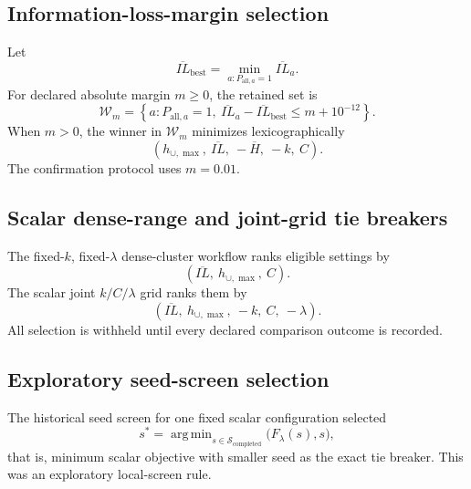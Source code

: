 \documentclass[11pt,a4paper]{article}
\DeclareMathOperator*{\argmin}{arg\,min}
\begin{document}
\subsection{Information-loss-margin selection}

Let
\begin{equation}
\overline{IL}_{\mathrm{best}}
=\min_{a:P_{\mathrm{all},a}=1}\overline{IL}_a.
\tag{93}
\end{equation}
For declared absolute margin $m\ge0$, the retained set is
\begin{equation}
\mathcal W_m=\left\{a:P_{\mathrm{all},a}=1,
\ \overline{IL}_a-\overline{IL}_{\mathrm{best}}
\le m+10^{-12}\right\}.
\tag{94}
\end{equation}
When $m>0$, the winner in $\mathcal W_m$ minimizes lexicographically
\begin{equation}
\left(h_{\cup,\max},\ \overline{IL},\ -\overline H,\ -k,\ C\right).
\tag{95}
\end{equation}
The confirmation protocol uses $m=0.01$.

\subsection{Scalar dense-range and joint-grid tie breakers}

The fixed-$k$, fixed-$\lambda$ dense-cluster workflow ranks eligible settings by
\begin{equation}
\left(\overline{IL},\ h_{\cup,\max},\ C\right).
\tag{96}
\end{equation}
The scalar joint $k/C/\lambda$ grid ranks them by
\begin{equation}
\left(\overline{IL},\ h_{\cup,\max},\ -k,\ C,\ -\lambda\right).
\tag{97}
\end{equation}
All selection is withheld until every declared comparison outcome is recorded.

\subsection{Exploratory seed-screen selection}

The historical seed screen for one fixed scalar configuration selected
\begin{equation}
s^*=\argmin_{s\in\mathcal S_{\mathrm{completed}}}
\bigl(F_\lambda(s),s\bigr),
\tag{98}
\end{equation}
that is, minimum scalar objective with smaller seed as the exact tie breaker.
This was an exploratory local-screen rule.
\end{document}
